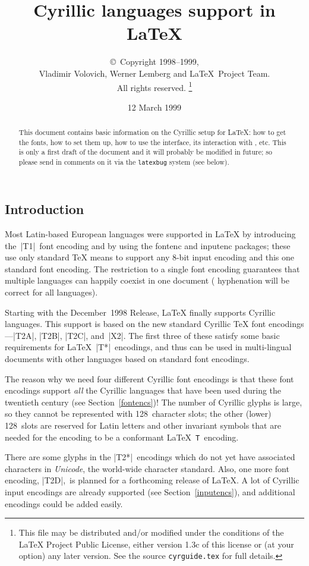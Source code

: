 \documentclass{ltxguide}[1999/02/28]
\title{Cyrillic languages support in \LaTeX}
\author{\copyright~Copyright 1998--1999,\\ Vladimir Volovich,
        Werner Lemberg and \LaTeX\ Project Team.\\ All rights reserved.%
        \footnote{This file may be distributed and/or modified under the
          conditions of the \LaTeX{} Project Public License, either version 1.3c
          of this license or (at your option) any later version. See the source
         \texttt{cyrguide.tex} for full details.}%
}
\date{12 March 1999}
\begin{document}
\maketitle
\tableofcontents

\begin{abstract}
  This document contains basic information on the Cyrillic setup for
  \LaTeX{}: how to get the fonts, how to set them up, how to use
  the interface, its interaction with \babel{}, etc. This is only a first
  draft of the document and it will probably be modified in future; so
  please send in comments on it via the \texttt{latexbug} system
  (see below).
\end{abstract}


\subsection{Introduction}

Most Latin-based European languages were supported in \LaTeX{} by
introducing the~|T1|~font encoding and by using the \textsf{fontenc}
and \textsf{inputenc} packages; these use only standard \TeX{} means
to support any \mbox{8-bit} input encoding and this one standard font
encoding.  The restriction to a single font encoding guarantees that
multiple languages can happily coexist in one document (\eg
hyphenation will be correct for all languages).

Starting with the December~1998 Release, \LaTeX{} finally supports
Cyrillic languages.  This support is based on the new standard
Cyrillic \TeX{} font encodings---|T2A|, |T2B|, |T2C|, and~|X2|.  The
first three of these satisfy some basic requirements for
\LaTeX{}~|T*|~encodings, and thus can be used in multi-lingual documents
with other languages based on standard font encodings.

The reason why we need four different Cyrillic font encodings is that
these font encodings support \emph{all} the Cyrillic languages that
have been used during the twentieth century (see
Section~\ref{fontencs})!  The number of Cyrillic glyphs is large, so
they cannot be represented with 128~character slots; the other (lower)
128~slots are reserved for Latin letters and other invariant symbols
that are needed for the encoding to be a conformant
\LaTeX{}~\texttt{T}~encoding.

There are some glyphs in the |T2*|~encodings which do not yet have
associated characters in \emph{Unicode}, the world-wide character
standard.  Also, one more font encoding, |T2D|,~is planned for a
forthcoming release of \LaTeX{}.  A lot of Cyrillic input encodings
are already supported (see Section~\ref{inputencs}), and additional
encodings could be added easily.
\end{document}
